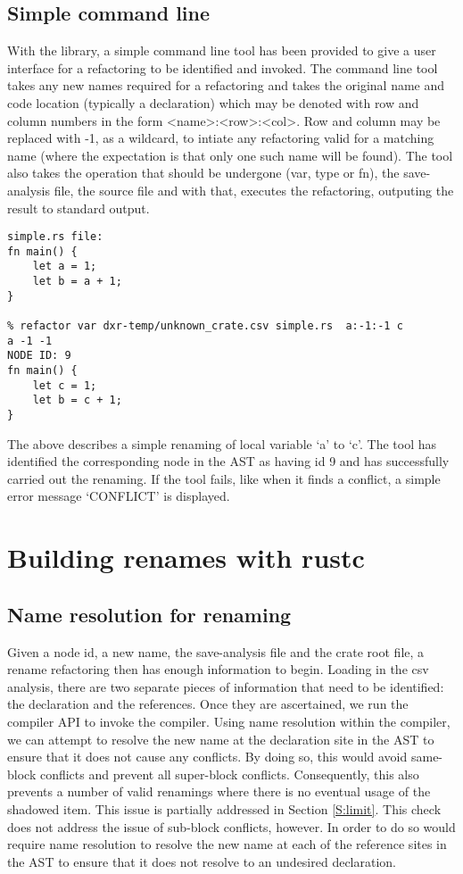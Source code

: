 \subsection{Simple command line}
With the library, a simple command line tool has been provided to give a user interface for a refactoring to be identified and invoked. The command line tool takes any new names required for a refactoring and takes the original name and code location (typically a declaration) which may be denoted with row and column numbers in the form \textless{}name\textgreater{}:\textless{}row\textgreater{}:\textless{}col\textgreater{}. Row and column may be replaced with -1, as a wildcard, to intiate any refactoring valid for a matching name (where the expectation is that only one such name will be found). The tool also takes the operation that should be undergone (var, type or fn), the save-analysis file, the source file and with that, executes the refactoring, outputing the result to standard output.

\begin{verbatim}
simple.rs file:
fn main() {
    let a = 1;
    let b = a + 1;
}

% refactor var dxr-temp/unknown_crate.csv simple.rs  a:-1:-1 c
a -1 -1
NODE ID: 9
fn main() {
    let c = 1;
    let b = c + 1;
}
\end{verbatim}

The above describes a simple renaming of local variable `a' to `c'. The tool has identified the corresponding node in the AST as having id 9 and has successfully carried out the renaming. If the tool fails, like when it finds a conflict, a simple error message `CONFLICT' is displayed.


\section{Building renames with rustc}\label{S:building}
\subsection{Name resolution for renaming}
Given a node id, a new name, the save-analysis file and the crate root file, a rename refactoring then has enough information to begin. Loading in the csv analysis, there are two separate pieces of information that need to be identified: the declaration and the references. Once they are ascertained, we run the compiler API to invoke the compiler. Using name resolution within the compiler, we can attempt to resolve the new name at the declaration site in the AST to ensure that it does not cause any conflicts. By doing so, this would avoid same-block conflicts and prevent all super-block conflicts. Consequently, this also prevents a number of valid renamings where there is no eventual usage of the shadowed item. This issue is partially addressed in Section \ref{S:limit}. This check does not address the issue of sub-block conflicts, however. In order to do so would require name resolution to resolve the new name at each of the reference sites in the AST to ensure that it does not resolve to an undesired declaration. 

